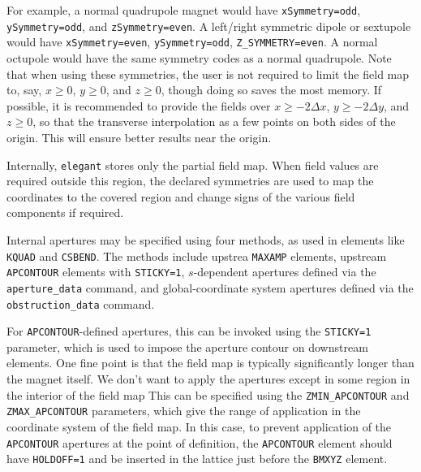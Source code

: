 For example, a normal quadrupole magnet would have
\verb|xSymmetry=odd|, \verb|ySymmetry=odd|, and \verb|zSymmetry=even|.  A left/right symmetric dipole or sextupole
would have \verb|xSymmetry=even|, \verb|ySymmetry=odd|,
\verb|Z_SYMMETRY=even|.  A normal octupole would have the same symmetry codes as a normal quadrupole.
Note that when using these symmetries, the user is not required to limit the field map to, say, 
$x\geq 0$, $y\geq 0$, and $z\geq 0$, though doing so saves the most memory.
If possible, it is recommended to provide the fields over $x\geq -2\Delta x$, $y\geq -2\Delta y$, 
and $z\geq 0$, so that the transverse interpolation as a few points on both sides of the origin.
This will ensure better results near the origin.

Internally, {\tt elegant} stores only the partial field map. When field values are required outside this region, the
declared symmetries are used to map the coordinates to the covered region and change signs of the various field
components if required.

Internal apertures may be specified using four methods, as used in elements like \verb|KQUAD| and
\verb|CSBEND|. The methods include upstrea \verb|MAXAMP| elements, upstream \verb|APCONTOUR| elements
with \verb|STICKY=1|, $s$-dependent apertures defined via the \verb|aperture_data| command,
and global-coordinate system apertures defined via the \verb|obstruction_data| command.

For \verb|APCONTOUR|-defined apertures, this can be invoked using the \verb|STICKY=1| parameter,
which is used to impose the aperture contour on downstream elements.
One fine point is that the field map is typically significantly longer than the magnet itself.
We don't want to apply the apertures except in some region in the interior of the field map
This can be specified using the \verb|ZMIN_APCONTOUR| and \verb|ZMAX_APCONTOUR| parameters,
which give the range of application in the coordinate system of the field map.
In this case, to prevent application of the \verb|APCONTOUR| apertures at the point of 
definition, the \verb|APCONTOUR| element should have \verb|HOLDOFF=1| and be inserted
in the lattice just before the \verb|BMXYZ| element.

